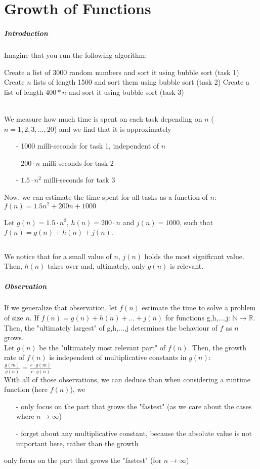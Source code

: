 \documentclass[10pt,a4paper]{book}
\newcommand{\R}{\mathbb{R}}
\newcommand{\N}{\mathbb{N}}
\newcommand{\ind}{\hspace*{\parindent}}
\begin{document}
\chapter{Growth of Functions}
\paragraph*{Introduction}
Imagine that you run the following algorithm:
\begin{algorithm}
\DontPrintSemicolon
Create a list of 3000 random numbers and sort it using bubble sort (task 1)\;
Create $n$ lists of length 1500 and sort them using bubble sort (task 2)\;
Create a list of length $400*n$ and sort it using bubble sort (task 3)
\caption{$Sort\_tasks(n: integer)$}
\end{algorithm}\\
\ind We measure how much time is spent on each task depending on $n$ ($n = 1,2,3,...,20$) and we find that it is approximately
\begin{itemize}
\item[-]1000 milli-seconds for task 1, independent of $n$
\item[-]$200\cdot n$ milli-seconds for task 2
\item[-]$1.5\cdot n^2$ milli-seconds for task 3
\end{itemize}
\ind Now, we can estimate the time spent for all tasks as a function of $n$: $f(n)=1.5n^{2}+200n+1000$\par
Let $g(n)=1.5\cdot n^2$, $h(n)=200\cdot n$ and $j(n)=1000$, such that $f(n)=g(n)+h(n)+j(n)$.\par
$\ $\par
We notice that for a small value of $n$, $j(n)$ holds the most significant value. Then, $h(n)$ takes over and, ultimately, only $g(n)$ is relevant.
\paragraph*{Observation}
\ind If we generalize that observation, let $f(n)$ estimate the time to solve a problem of size $n$. If $f(n)=g(n)+h(n)+...+j(n)$ for functions g,h,...,j: $\N \to \R$. Then, the "ultimately largest" of g,h,...,j determines the behaviour of $f$ as $n$ grows.\\
\ind Let $g(n)$ be the "ultimately most relevant part" of $f(n)$. Then, the growth rate of $f(n)$ is independent of multiplicative constants in $g(n)$:
$\frac{g(m)}{g(n)}=\frac{c\cdot g(m)}{c\cdot g(n)}$\\
\ind With all of those observations, we can deduce than when considering a runtime function (here $f(n)$), we 
\begin{itemize}
\item[-]only focus on the part that grows the "fastest" (as we care about the cases where $n \to \infty$)
\item[-]forget about any multiplicative constant, because the absolute value is not important here, rather than the growth
\end{itemize}
only focus on the part that grows the "fastest" (for $n \to \infty$)
\end{document}
